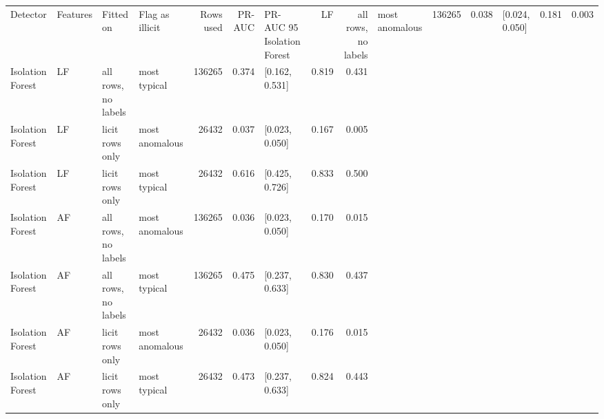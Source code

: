 \begin{tabular}{llllrrlrr}
\toprule
Detector & Features & Fitted on & Flag as illicit & Rows used & PR-AUC & PR-AUC 95%
\midrule
Isolation Forest & LF & all rows, no labels & most anomalous & 136265 & 0.038 & [0.024, 0.050] & 0.181 & 0.003 \\
Isolation Forest & LF & all rows, no labels & most typical & 136265 & 0.374 & [0.162, 0.531] & 0.819 & 0.431 \\
Isolation Forest & LF & licit rows only & most anomalous & 26432 & 0.037 & [0.023, 0.050] & 0.167 & 0.005 \\
Isolation Forest & LF & licit rows only & most typical & 26432 & 0.616 & [0.425, 0.726] & 0.833 & 0.500 \\
Isolation Forest & AF & all rows, no labels & most anomalous & 136265 & 0.036 & [0.023, 0.050] & 0.170 & 0.015 \\
Isolation Forest & AF & all rows, no labels & most typical & 136265 & 0.475 & [0.237, 0.633] & 0.830 & 0.437 \\
Isolation Forest & AF & licit rows only & most anomalous & 26432 & 0.036 & [0.023, 0.050] & 0.176 & 0.015 \\
Isolation Forest & AF & licit rows only & most typical & 26432 & 0.473 & [0.237, 0.633] & 0.824 & 0.443 \\
\bottomrule
\end{tabular}
